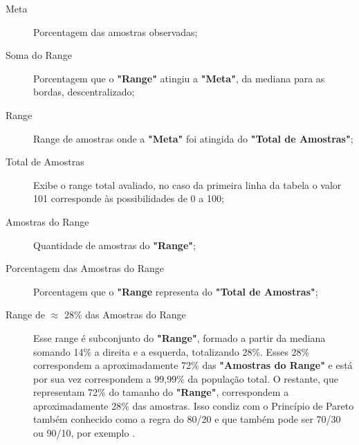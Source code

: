\vspace{-8mm}
\begin{description}
   \item[Meta] Porcentagem das amostras observadas;
   \item[Soma do Range] Porcentagem que o \textbf{"Range"} atingiu a \textbf{"Meta"}, da mediana para as bordas, descentralizado;
   \item[Range] Range de amostras onde a \textbf{"Meta"} foi atingida do \textbf{"Total de Amostras"};
   \item[Total de Amostras] Exibe o range total avaliado, no caso da primeira linha da tabela o valor 101 corresponde às possibilidades de 0 a 100;
   \item[Amostras do Range] Quantidade de amostras do \textbf{"Range"};
   \item[Porcentagem das Amostras do Range] Porcentagem que o \textbf{"Range} representa do \textbf{"Total de Amostras"};
   \item[Range de $\approx$ 28\% das Amostras do Range] Esse range é  subconjunto do \textbf{"Range"}, formado a partir da mediana somando 14\% a direita e a esquerda, totalizando 28\%. Esses 28\% correspondem a aproximadamente 72\% das \textbf{"Amostras do Range"} e está por sua vez correspondem a 99,99\% da população total. O restante, que representam 72\% do tamanho do \textbf{"Range"}, correspondem a aproximadamente 28\% das amostras. Isso condiz com o Princípio de Pareto também conhecido como a regra do 80/20 e que também pode ser 70/30 ou 90/10, por exemplo \cite{administradores_principio_pareto}.
\end{description}
\bigbreak

